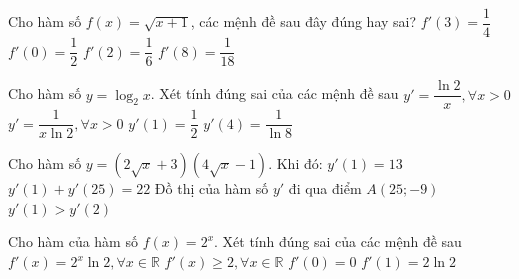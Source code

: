 \begin{ex}%
 Cho  hàm số $f(x)=\sqrt{x+1}$, các mệnh đề sau đây đúng hay sai?
  \choiceTF
   {\True $f'(3)=\dfrac{1}{4}$}
   {\True $f'(0)=\dfrac{1}{2}$}
   {$f'(2)=\dfrac{1}{6}$}
   {$f'(8)=\dfrac{1}{18}$}
\end{ex}

\begin{ex}%
 Cho hàm số $y=\log_2x$. Xét tính đúng sai  của các mệnh đề sau
  \choiceTF
  {$y'=\dfrac{\ln 2}{x}, \forall x>0$} 
  {\True $y'=\dfrac{1}{x\ln  2}, \forall x>0$}
  {\True  $y'(1)=\dfrac{1}{2}$}
   {$y'(4)=\dfrac{1}{\ln 8}$}
\end{ex}

\begin{ex}%
 Cho hàm số $y=(2 \sqrt{x}+3)(4 \sqrt{x}-1)$. Khi  đó:
  \choiceTF
  {\True $y'\left( 1  \right)=13$}
  {\True $y'\left( 1 \right)+y'\left( 25 \right)=22$} 
  {Đồ thị của hàm  số $y'$ đi qua điểm $A\left( 25;-9 \right)$}
  {\True $y'\left( 1 \right)>y'\left(  2 \right)$}
\end{ex}

\begin{ex}%
 Cho hàm của hàm số $f(x)=2^x$. Xét  tính đúng sai của các mệnh đề sau
  \choiceTF
  {\True $f'(x)=2^x\ln  2, \forall x\in\mathbb{R}$}
   {$f'(x)\geq 2, \forall x\in\mathbb{R}$}
   {$f'(0)=0$}
  {\True $f'(1)=2\ln  2$}
\end{ex}

